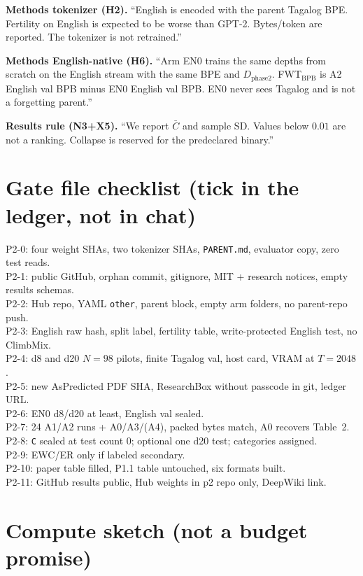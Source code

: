 \documentclass[11pt,a4paper]{article}
\begin{document}
\textbf{Methods tokenizer (H2).} ``English is encoded with the parent Tagalog BPE. Fertility on English is expected to be worse than GPT-2. Bytes/token are reported. The tokenizer is not retrained.''

\textbf{Methods English-native (H6).} ``Arm EN0 trains the same depths from scratch on the English stream with the same BPE and $D_{\mathrm{phase2}}$. FWT$_{\mathrm{BPB}}$ is A2 English val BPB minus EN0 English val BPB. EN0 never sees Tagalog and is not a forgetting parent.''

\textbf{Results rule (N3+X5).} ``We report $\bar C$ and sample SD. Values below $0.01$ are not a ranking. Collapse is reserved for the predeclared binary.''

\section{Gate file checklist (tick in the ledger, not in chat)}
\label{app:ticks}

P2-0: four weight SHAs, two tokenizer SHAs, \texttt{PARENT.md}, evaluator copy, zero test reads.\\
P2-1: public GitHub, orphan commit, gitignore, MIT + research notices, empty results schemas.\\
P2-2: Hub repo, YAML \texttt{other}, parent block, empty arm folders, no parent-repo push.\\
P2-3: English raw hash, split label, fertility table, write-protected English test, no ClimbMix.\\
P2-4: d8 and d20 $N=98$ pilots, finite Tagalog val, host card, VRAM at $T=2048$.\\
P2-5: new AsPredicted PDF SHA, ResearchBox without passcode in git, ledger URL.\\
P2-6: EN0 d8/d20 at least, English val sealed.\\
P2-7: 24 A1/A2 runs + A0/A3/(A4), packed bytes match, A0 recovers Table~2.\\
P2-8: \texttt{C} sealed at test count 0; optional one d20 test; categories assigned.\\
P2-9: EWC/ER only if labeled secondary.\\
P2-10: paper table filled, P1.1 table untouched, six formats built.\\
P2-11: GitHub results public, Hub weights in p2 repo only, DeepWiki link.

\section{Compute sketch (not a budget promise)}
\label{app:compute}
\end{document}
